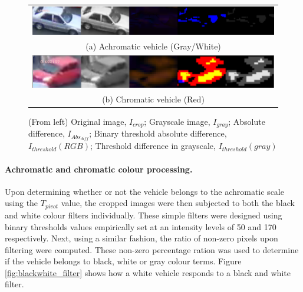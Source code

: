 \begin{figure}[htb!]
  \centering
\begin{tabular}{c}
 \includegraphics[width=0.9\linewidth]{image/general/achromatic_threshold5.PNG} \\  
 (a) Achromatic vehicle (Gray/White) \\
 \includegraphics[width=0.9\linewidth]{image/general/achromatic_threshold_color2.PNG}\\
(b) Chromatic vehicle (Red)
\end{tabular}
\caption{(From left) Original image, $I_{crop}$; Grayscale image, $I_{gray}$; Absolute difference, $I_{Abs_{diff}}$; Binary threshold absolute difference, $I_{threshold}(RGB)$; Threshold difference in grayscale, $I_{threshold}(gray)$} \label{fig:achromatic_thresh}
\end{figure}



\paragraph{Achromatic and chromatic colour processing.} Upon determining whether or not the vehicle belongs to the achromatic scale using the $T_{pivot}$ value, the cropped images were then subjected to both the black and white colour filters individually. These simple filters were designed using binary thresholds values empirically set at an intensity levels of 50 and 170 respectively. Next, using a similar fashion, the ratio of non-zero pixels upon filtering were computed. These non-zero percentage ration was used to determine if the vehicle belongs to black, white or gray colour terms. Figure \ref{fig:blackwhite_filter} shows how a white vehicle responds to a black and white filter. 


